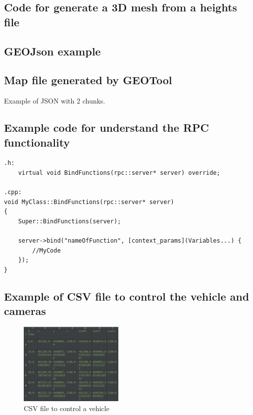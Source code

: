 \documentclass[10pt,a4paper,twocolumn,twoside]{article}
\begin{document}
\subsection{Code for generate a 3D mesh from a heights file}
\label{appendix:generateobj}


\subsection{GEOJson example}
\label{appendix:geojson}


\subsection{Map file generated by GEOTool}
\label{appendix:mapjson}

Example of JSON with 2 chunks.


\subsection{Example code for understand the RPC functionality}
\label{appendix:extendrpc}

\lstset{language=C} 
\begin{lstlisting}
.h:
	virtual void BindFunctions(rpc::server* server) override;
	
.cpp:
void MyClass::BindFunctions(rpc::server* server)
{
	Super::BindFunctions(server);

	server->bind("nameOfFunction", [context_params](Variables...) {
		//MyCode
	});
}

\end{lstlisting}

\subsection{Example of CSV file to control the vehicle and cameras}
\label{appendix:fitxerscsv}

\vspace{0cm}
\begin{figure}[!h]
\centering
  	\includegraphics[width=0.45\textwidth]{fitxervehicle}
	\captionsetup{labelformat=empty}
	\caption{CSV file to control a vehicle}
	\label{fig-fitxervehicle}
\end{figure}
\end{document}
